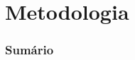 \documentclass{beamer}
\begin{document}
%		
%	
%		
%		
%	
%	
%
%	
%	
%	
%	
%	
%	





\section{Metodologia}

\begin{frame}
	\frametitle{Sumário}
	\tableofcontents[currentsection]
\end{frame}
\end{document}
